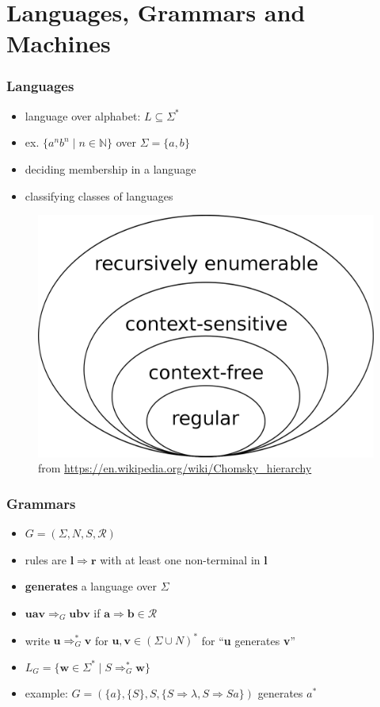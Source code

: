 \documentclass{beamer}
\begin{document}
\section{Languages, Grammars and Machines}

\begin{frame}
\frametitle{Languages}
\begin{itemize}
  \item language over alphabet: $L \subseteq \Sigma^*$
  \item ex. $\{a^nb^n \mid n \in \mathbb{N}\}$ over $\Sigma = \{a, b\}$
  \item deciding membership in a language
  \item classifying classes of languages
\end{itemize}
\begin{figure}
  \includegraphics[height=0.4\textwidth]{Chomsky-hierarchy.png}
  \caption{from \url{https://en.wikipedia.org/wiki/Chomsky_hierarchy}}
\end{figure}
\end{frame}


\begin{frame}
\frametitle{Grammars}
\begin{itemize}
  \item $G = (\Sigma, N, S, \mathcal{R})$
  \item rules are $\mathbf{l} \Rightarrow \mathbf{r}$ with at least one
    non-terminal in $\mathbf{l}$
  \item \textbf{generates} a language over $\Sigma$
  \item $\mathbf{uav} \Rightarrow_G \mathbf{ubv}$ if $\mathbf{a}
    \Rightarrow \mathbf{b} \in \mathcal{R}$
  \item write $\mathbf{u} \Rightarrow_{G}^* \mathbf{v}$ for $\mathbf{u, v} \in
    (\Sigma \cup N)^*$ for ``\textbf{u} generates \textbf{v}''
  \item $L_G = \{\mathbf{w} \in \Sigma^* \mid S \Rightarrow_G^* \mathbf{w}\}$
  \item example: $G = (\{a\}, \{S\}, S, \{S \Rightarrow \lambda, S \Rightarrow
    Sa\})$ generates $a^*$
\end{itemize}
\end{frame}
\end{document}

